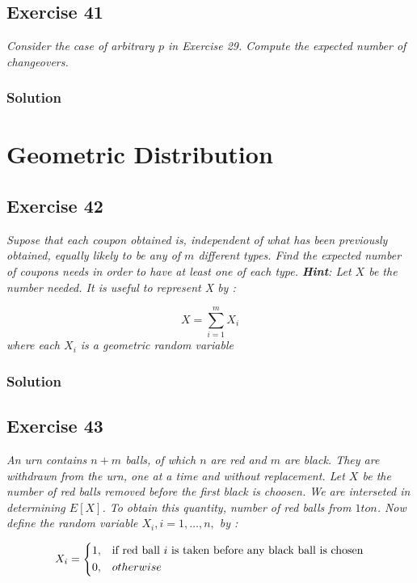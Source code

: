 \documentclass[12pt,a4paper]{article}
\begin{document}
\subsection{Exercise 41}
\textit{Consider the case of arbitrary $p$ in Exercise 29. Compute the expected number of changeovers.}

\subsubsection{Solution}

\section{Geometric Distribution}
\subsection{Exercise 42}
\textit{Supose that each coupon obtained is, independent of what has been previously obtained, equally likely to be any of $m$ different types. Find the expected number of coupons needs in order to have at least one of each type. \textbf{Hint}: Let $X$ be the number needed. It is useful to represent X by :}

\[
    X = \sum^m_{i=1} X_i
\]
\textit{where each $X_i$ is a geometric random variable}

\subsubsection{Solution}

\subsection{Exercise 43}
\textit{An urn contains $n+m$ balls, of which $n$ are red and $m$ are black. They are withdrawn from the urn, one at a time and without replacement. Let $X$ be the number of red balls removed before the first black is choosen. We are interseted in determining $E[X]$. To obtain this quantity, number of red balls from $1 to n$. Now define the random variable $X_i, i=1, \dots, n,$ by : }

\[X_i = 
\begin{dcases}
    1, & \text{if red ball $i$ is taken before any black ball is chosen} \\
    0, & otherwise
\end{dcases}

\]
\end{document}
